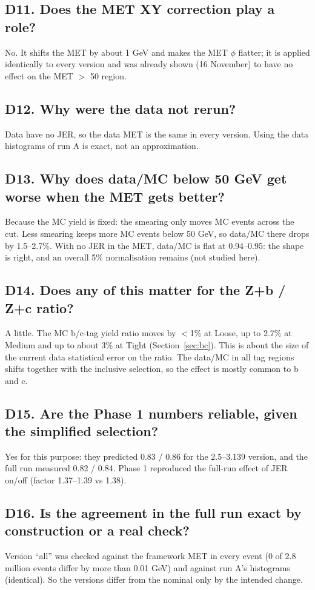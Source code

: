 \documentclass[11pt,a4paper]{article}
\begin{document}
\subsection*{D11. Does the MET XY correction play a role?}
No. It shifts the MET by about 1 GeV and makes the MET $\phi$ flatter; it is applied identically to every version and was already
shown (16 November) to have no effect on the MET $>$ 50 region.

\subsection*{D12. Why were the data not rerun?}
Data have no JER, so the data MET is the same in every version. Using the data histograms of run A is exact, not an approximation.

\subsection*{D13. Why does data/MC below 50 GeV get worse when the MET gets better?}
Because the MC yield is fixed: the smearing only moves MC events across the cut. Less smearing keeps more MC events below 50 GeV, so
data/MC there drops by 1.5--2.7\%. With no JER in the MET, data/MC is flat at 0.94--0.95: the shape is right, and an overall 5\%
normalisation remains (not studied here).

\subsection*{D14. Does any of this matter for the Z+b / Z+c ratio?}
A little. The MC b/c-tag yield ratio moves by $<$1\% at Loose, up to 2.7\% at Medium and up to about 3\% at Tight
(Section~\ref{sec:bc}). This is about the size of the current data statistical error on the ratio. The data/MC in all tag regions
shifts together with the inclusive selection, so the effect is mostly common to b and c.

\subsection*{D15. Are the Phase 1 numbers reliable, given the simplified selection?}
Yes for this purpose: they predicted 0.83 / 0.86 for the 2.5--3.139 version, and the full run measured 0.82 / 0.84. Phase 1 reproduced
the full-run effect of JER on/off (factor 1.37--1.39 vs 1.38).

\subsection*{D16. Is the agreement in the full run exact by construction or a real check?}
Version ``all'' was checked against the framework MET in every event (0 of 2.8 million events differ by more than 0.01 GeV) and against
run A's histograms (identical). So the versions differ from the nominal only by the intended change.
\end{document}
